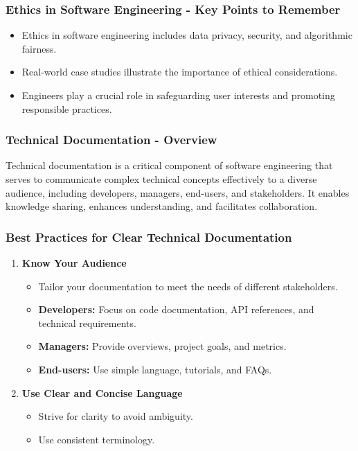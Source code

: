 \documentclass{beamer}
\begin{document}
\begin{frame}[fragile]
    \frametitle{Ethics in Software Engineering - Key Points to Remember}
    \begin{itemize}
        \item Ethics in software engineering includes data privacy, security, and algorithmic fairness.
        \item Real-world case studies illustrate the importance of ethical considerations.
        \item Engineers play a crucial role in safeguarding user interests and promoting responsible practices.
    \end{itemize}
\end{frame}

\begin{frame}[fragile]
    \frametitle{Technical Documentation - Overview}
    Technical documentation is a critical component of software engineering that serves to communicate complex technical concepts effectively to a diverse audience, including developers, managers, end-users, and stakeholders. It enables knowledge sharing, enhances understanding, and facilitates collaboration.
\end{frame}

\begin{frame}[fragile]
    \frametitle{Best Practices for Clear Technical Documentation}
    \begin{enumerate}
        \item \textbf{Know Your Audience}
        \begin{itemize}
            \item Tailor your documentation to meet the needs of different stakeholders.
            \item \textbf{Developers:} Focus on code documentation, API references, and technical requirements.
            \item \textbf{Managers:} Provide overviews, project goals, and metrics.
            \item \textbf{End-users:} Use simple language, tutorials, and FAQs.
        \end{itemize}
        \item \textbf{Use Clear and Concise Language}
        \begin{itemize}
            \item Strive for clarity to avoid ambiguity.
            \item Use consistent terminology.
        \end{itemize}
    \end{enumerate}
\end{frame}
\end{document}
